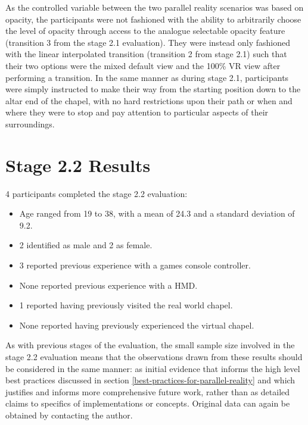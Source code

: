 As the controlled variable between the two parallel reality scenarios was based on opacity, the participants were not fashioned with the ability to arbitrarily choose the level of opacity through access to the analogue selectable opacity feature (transition 3 from the stage 2.1 evaluation). They were instead only fashioned with the linear interpolated transition (transition 2 from stage 2.1) such that their two options were the mixed default view and the 100\% VR view after performing a transition. In the same manner as during stage 2.1, participants were simply instructed to make their way from the starting position down to the altar end of the chapel, with no hard restrictions upon their path or when and where they were to stop and pay attention to particular aspects of their surroundings.


\section{Stage 2.2 Results}

4 participants completed the stage 2.2 evaluation:
\begin{itemize}
	\item Age ranged from 19 to 38, with a mean of 24.3 and a standard deviation of 9.2.
	\item 2 identified as male and 2 as female.
	\item 3 reported previous experience with a games console controller.
	\item None reported previous experience with a HMD.
	\item 1 reported having previously visited the real world chapel.
	\item None reported having previously experienced the virtual chapel.
\end{itemize}

As with previous stages of the evaluation, the small sample size involved in the stage 2.2 evaluation means that the observations drawn from these results should be considered in the same manner: as initial evidence that informs the high level best practices discussed in section \ref{best-practices-for-parallel-reality} and which justifies and informs more comprehensive future work, rather than as detailed claims to specifics of implementations or concepts. Original data can again be obtained by contacting the author.

